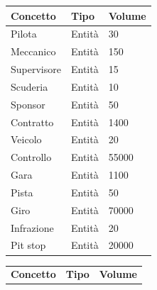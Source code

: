 \documentclass[11pt]{article}
\begin{document}
\begin{center}
    \begin{tabular}{ |l|l|l| }
        \hline
        \textbf{Concetto} & \textbf{Tipo} & \textbf{Volume} \\
        
        \hline
        Pilota & Entità & 30 \\
        \hline
        Meccanico & Entità & 150 \\
        \hline
        Supervisore & Entità & 15 \\
        \hline
        Scuderia & Entità & 10 \\
        \hline
        Sponsor & Entità & 50 \\
        \hline
        Contratto & Entità & 1400 \\
        \hline
        Veicolo & Entità & 20 \\
        \hline
        Controllo & Entità & 55000 \\ %
        \hline
        Gara & Entità & 1100 \\
        \hline
        Pista & Entità & 50 \\
        \hline
        Giro & Entità & 70000 \\ %
        \hline
        Infrazione & Entità & 20 \\
        \hline
        Pit stop & Entità & 20000 \\
        \hline
    \end{tabular}
        \quad
    \begin{tabular}{ |l|l|l| }
        \hline
        \textbf{Concetto} & \textbf{Tipo} & \textbf{Volume} \\


\end{tabular}
\end{center}
\end{document}
